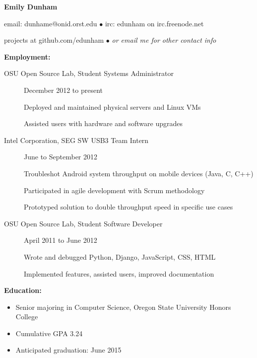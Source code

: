 \documentclass[11pt]{article}
\begin{document}
\centerline{{\LARGE \bf Emily Dunham}}

\bigskip

\centerline{email: dunhame@onid.orst.edu
        $\bullet$
        irc: edunham on irc.freenode.net}
\centerline{projects at github.com/edunham
        $\bullet$
        \emph{or email me for other contact info}}

\bigskip
\hrulefill
\bigskip

{\Large \bf Employment:}
\begin{description}
\item[OSU Open Source Lab, Student Systems Administrator]
    \hfill December 2012 to present

    Deployed and maintained physical servers and Linux VMs

    Assisted users with hardware and software upgrades

\item[Intel Corporation, SEG SW USB3 Team Intern]
    \hfill June to September 2012

    Troubleshot Android system throughput on mobile devices (Java, C, C++)

    Participated in agile development with Scrum methodology

    Prototyped solution to double throughput speed in specific use cases

\item[OSU Open Source Lab, Student Software Developer]
    \hfill April 2011 to June 2012

    Wrote and debugged Python, Django, JavaScript, CSS, HTML

    Implemented features, assisted users, improved documentation
\end{description}

\smallskip
\hrulefill
\bigskip

{\Large \bf Education:}
\begin{itemize}
    \setlength{\itemsep}{1pt}
    \setlength{\parskip}{0pt}
    \setlength{\parsep}{0pt}

    \item Senior majoring in Computer Science, Oregon State University
          Honors College
    \item Cumulative GPA 3.24
    \item Anticipated graduation: June 2015

\end{itemize}

\smallskip
\hrulefill
\bigskip
\end{document}
